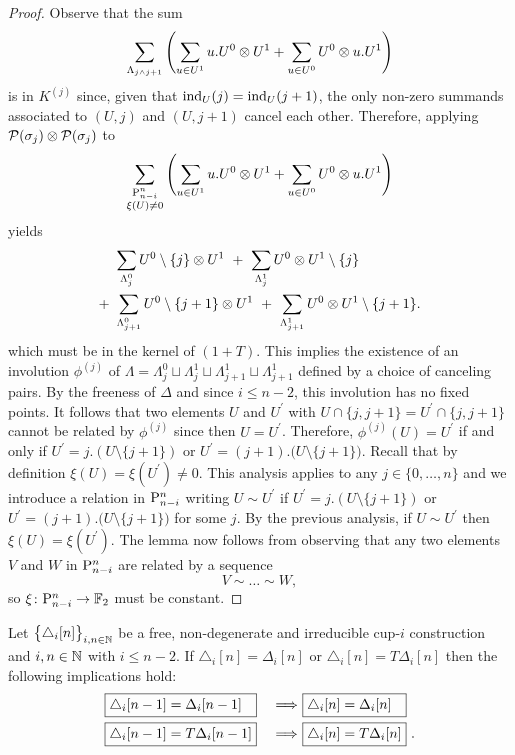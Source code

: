 \begin{proof}
	Observe that the sum
	\[
	\sum_{\Lambda_{j \wedge j+1}} \left( \sum_{u \in U^1} {u.U^0} \ot {U^1} +
	\sum_{u \in U^0} {U^0} \ot {u.U^1} \right)
	\]
	is in $K^{(j)}$ since, given that $\ind_U(j) = \ind_U(j+1)$, the only non-zero summands associated to $(U,j)$ and $(U,j+1)$ cancel each other.
	Therefore, applying $\cP(\sigma_j) \ot \cP(\sigma_j)$ to
	\[
	\sum_{\substack{\P_{n-i}^n \\ \xi(U) \neq 0}} \left(\sum_{u \in U^1} {u.U^0} \ot {U^1} +
	\sum_{u \in U^0} {U^0} \ot {u.U^1} \right)
	\]
	yields
	\begin{align*}
	&\sum_{\Lambda_{j}^0} U^0 \setminus \{j\} \ot {U^1} \ + \
	\sum_{\Lambda_{j}^1} U^0 \ot {U^1} \setminus \{j\} \\ + \
	&\sum_{\Lambda_{j+1}^0} U^0 \setminus \{j+1\} \ot {U^1} \ + \
	\sum_{\Lambda_{j+1}^1} U^0 \ot {U^1} \setminus \{j+1\}.
	\end{align*}
	which must be in the kernel of $(1+T)$.
	This implies the existence of an involution $\phi^{(j)}$ of $\Lambda = \Lambda^0_{j} \sqcup \Lambda^1_{j} \sqcup \Lambda^1_{j+1} \sqcup \Lambda^1_{j+1}$ defined by a choice of canceling pairs.
	By the freeness of $\Delta$ and since $i \leq n-2$, this involution has no fixed points.
	It follows that two elements $U$ and $U^\prime$ with $U \cap \{j, j+1\} = U^\prime \cap \{j, j+1\}$ cannot be related by $\phi^{(j)}$ since then $U = U^\prime$.
	Therefore, $\phi^{(j)}(U) = U^\prime$ if and only if $U^\prime = j.(U \setminus \{j+1\})$ or $U^\prime = (j+1).\big( U \setminus \{j+1\} \big)$.
	Recall that by definition $\xi(U) = \xi(U^\prime) \neq 0$.
	This analysis applies to any $j \in \{0, \dots, n\}$ and we introduce a relation in $\P_{n-i}^n$ writing $U \sim U^\prime$ if $U^\prime = j.(U \setminus \{j+1\})$ or $U^\prime = (j+1).\big( U \setminus \{j+1\} \big)$ for some $j$.
	By the previous analysis, if $U \sim U^\prime$ then $\xi(U) = \xi(U^\prime)$.
	The lemma now follows from observing that any two elements $V$ and $W$ in $\P_{n-i}^n$ are related by a sequence
	\[
	V \sim \dots \sim W,
	\]
	so $\xi \colon \P_{n-i}^n \to \F$ must be constant.
\end{proof}

\begin{lemma} \label{l:second nail}
	Let $\big\{ \triangle_i [n] \big\}_{i,n\in\N}$ be a free, non-degenerate and irreducible cup-$i$ construction and $i,n \in \N$ with $i \leq n-2$.
	If $\triangle_i [n] = \Delta_i [n]$ or $\triangle_i [n] = T \Delta_i [n]$ then the following implications hold:
	\begin{alignat*}{2}
	&\boxed{\triangle_i [n-1] = \Delta_i [n-1] \kern 7.3pt}\ &\Longrightarrow\
	&\boxed{\triangle_i [n] = \Delta_i [n] \kern 7.3pt} \\
	&\boxed{\triangle_i [n-1] = T \Delta_i [n-1]}\ &\Longrightarrow\
	&\boxed{\triangle_i [n] = T \Delta_i [n]} \ .
	\end{alignat*}
\end{lemma}

